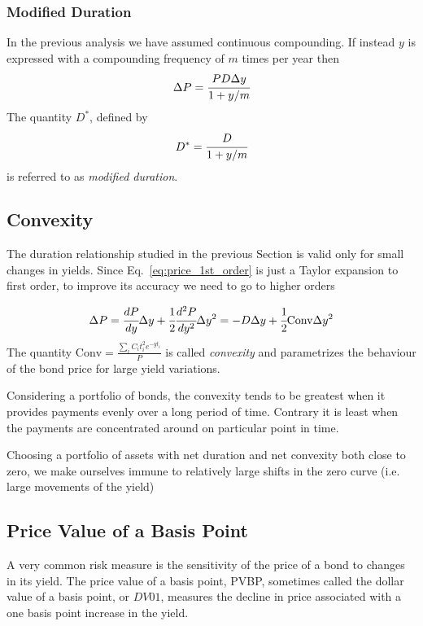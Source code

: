 \subsubsection{Modified Duration}
In the previous analysis we have assumed continuous compounding. If instead $y$ is expressed with a compounding frequency of $m$ times per year then 
\begin{equation}
\Delta P = \cfrac{PD\Delta y}{1+y/m}
\end{equation}
\noindent
The quantity $D^{*}$, defined by
\begin{equation}
D^{*} = \cfrac{D}{1+y/m}
\end{equation}
\noindent
is referred to as \emph{modified duration}. 

\subsection{Convexity}
The duration relationship studied in the previous Section is valid only for small changes in yields. Since Eq.~\ref{eq:price_1st_order} is just a Taylor expansion to first order, to improve its accuracy we need to go to higher orders

\begin{equation}
\Delta P = \cfrac{dP}{dy}\Delta y + \cfrac{1}{2} \cfrac{d^2 P}{dy^2}\Delta y^2 = -D\Delta y + \cfrac{1}{2} \textrm{Conv} \Delta y^2 
\end{equation}
\noindent
The quantity $\textrm{Conv} = \frac{\sum_i C_i t_i^2 e^{-yt_i}}{P}$ is called \emph{convexity} and parametrizes the behaviour of the bond price for large yield variations.

Considering a portfolio of bonds, the convexity tends to be greatest when it provides payments evenly over a long period of time. Contrary it is least when the payments are concentrated around on particular point in time. 

Choosing a portfolio of assets with net duration and net convexity both close to zero, we make ourselves immune to relatively large shifts in the zero curve (i.e. large movements of the yield)

\subsection{Price Value of a Basis Point}
A very common risk measure is the sensitivity of the price of a bond to changes in its yield. The price value of a basis point, PVBP, sometimes called the dollar value of a basis point, or $DV01$, measures the decline in price associated with a one basis point increase in the yield.

